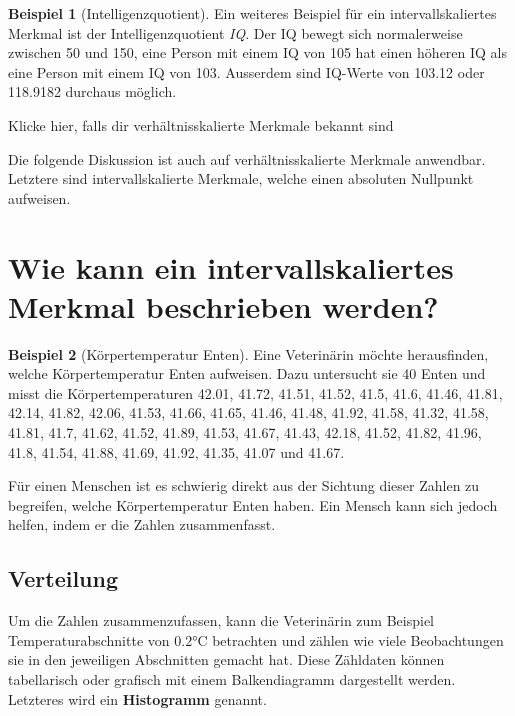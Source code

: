 \documentclass[
]{book}
\theoremstyle{definition}
\theoremstyle{definition}
\newtheorem{example}{Beispiel}[chapter]
\theoremstyle{definition}
\theoremstyle{definition}
\theoremstyle{remark}
\begin{document}
\begin{example}[Intelligenzquotient]
\protect\hypertarget{exm:iq}{}\label{exm:iq}Ein weiteres Beispiel für ein intervallskaliertes Merkmal ist der Intelligenzquotient \emph{IQ}. Der IQ bewegt sich normalerweise zwischen 50 und 150, eine Person mit einem IQ von 105 hat einen höheren IQ als eine Person mit einem IQ von 103. Ausserdem sind IQ-Werte von 103.12 oder 118.9182 durchaus möglich.
\end{example}

Klicke hier, falls dir verhältnisskalierte Merkmale bekannt sind

Die folgende Diskussion ist auch auf verhältnisskalierte Merkmale anwendbar. Letztere sind intervallskalierte Merkmale, welche einen absoluten Nullpunkt aufweisen.

\section{Wie kann ein intervallskaliertes Merkmal beschrieben werden?}\label{intervallskalierte-merkmale-beschreibung}

\begin{example}[Körpertemperatur Enten]
\protect\hypertarget{exm:ducktemp}{}\label{exm:ducktemp}Eine Veterinärin möchte herausfinden, welche Körpertemperatur Enten aufweisen. Dazu untersucht sie 40 Enten und misst die Körpertemperaturen 42.01, 41.72, 41.51, 41.52, 41.5, 41.6, 41.46, 41.81, 42.14, 41.82, 42.06, 41.53, 41.66, 41.65, 41.46, 41.48, 41.92, 41.58, 41.32, 41.58, 41.81, 41.7, 41.62, 41.52, 41.89, 41.53, 41.67, 41.43, 42.18, 41.52, 41.82, 41.96, 41.8, 41.54, 41.88, 41.69, 41.92, 41.35, 41.07 und 41.67.
\end{example}

Für einen Menschen ist es schwierig direkt aus der Sichtung dieser Zahlen zu begreifen, welche Körpertemperatur Enten haben. Ein Mensch kann sich jedoch helfen, indem er die Zahlen zusammenfasst.

\subsection{Verteilung}\label{verteilung}

Um die Zahlen zusammenzufassen, kann die Veterinärin zum Beispiel Temperaturabschnitte von \(0.2\)°C betrachten und zählen wie viele Beobachtungen sie in den jeweiligen Abschnitten gemacht hat. Diese Zähldaten können tabellarisch oder grafisch mit einem Balkendiagramm dargestellt werden. Letzteres wird ein \textbf{Histogramm} genannt.
\end{document}

